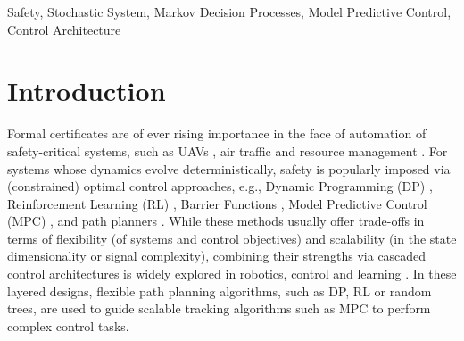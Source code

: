\documentclass{IEEEtran}
\begin{document}
\begin{IEEEkeywords}
Safety, Stochastic System, Markov Decision Processes, Model Predictive Control, Control Architecture
\end{IEEEkeywords}



\section{Introduction}
Formal certificates are of ever rising importance in the face of automation of safety-critical systems, such as UAVs \cite{schmid2022real}, air traffic \cite{prandini2008application} and resource management \cite{pitchford2007uncertainty}. For systems whose dynamics evolve deterministically, safety is popularly imposed via (constrained) optimal control approaches, e.g., Dynamic Programming (DP) \cite{lygeros1999controllers}, Reinforcement Learning (RL) \cite{garcia2015comprehensive}, Barrier Functions \cite{ames2016control}, Model Predictive Control (MPC) \cite{borrelli2017predictive}, and path planners \cite{karaman2011sampling}. While these methods usually offer trade-offs in terms of flexibility (of systems and control objectives) and scalability (in the state dimensionality or signal complexity), combining their strengths via cascaded control architectures is widely explored in robotics, control and learning \cite{dong2023review, matni2024towards,stamouli2025layered, fan2020fast, feher2020hierarchical, stulp2012reinforcement, benders2025embedded}. In these layered designs, flexible path planning algorithms, such as DP, RL or random trees, are used to guide scalable tracking algorithms such as MPC to perform complex control tasks. %
\end{document}
